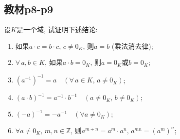 \subsection{教材p8-p9}

\begin{problem}\label{ex:1.1.1}
    设$K$是一个域, 试证明下述结论:  
    
    \begin{enumerate}[(1)]
        \item 如果$a \cdot c = b \cdot c$, $c \neq 0_K$, 则$a = b$ (乘法消去律);
        \item $\forall \, a, b\in K$, 如果$a \cdot b = 0_K$, 则$a = 0_K$或$b = 0_K$;
        \item $(a^{-1})^{-1} = a \quad (\forall \, a \in K ,\, a \neq 0_K)$;
        \item $(a \cdot b)^{-1} = a^{-1} \cdot b^{-1} \quad (a \neq 0_K ,\, b \neq 0_K)$;
        \item $(-a)^{-1} = -a^{-1} \quad (\forall a \neq 0_K)$;
        \item $\forall a \neq 0_K ,\, m, n \in \mathbb{Z}$, 则$a^{m + n} = a^m \cdot a^n ,\, a^{mn} = (a^m)^n$;
    \end{enumerate}
\end{problem}

